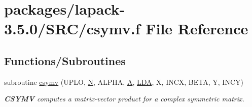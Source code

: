 \hypertarget{csymv_8f}{}\section{packages/lapack-\/3.5.0/\+S\+R\+C/csymv.f File Reference}
\label{csymv_8f}
\subsection*{Functions/\+Subroutines}
\begin{DoxyCompactItemize}
\item 
subroutine \hyperlink{group__complexSYauxiliary_gae013512af4fd2c59629f1708ca4de36a}{csymv} (U\+P\+L\+O, \hyperlink{polmisc_8c_a0240ac851181b84ac374872dc5434ee4}{N}, A\+L\+P\+H\+A, \hyperlink{classA}{A}, \hyperlink{example__user_8c_ae946da542ce0db94dced19b2ecefd1aa}{L\+D\+A}, X, I\+N\+C\+X, B\+E\+T\+A, Y, I\+N\+C\+Y)
\begin{DoxyCompactList}\small\item\em {\bfseries C\+S\+Y\+M\+V} computes a matrix-\/vector product for a complex symmetric matrix. \end{DoxyCompactList}\end{DoxyCompactItemize}
